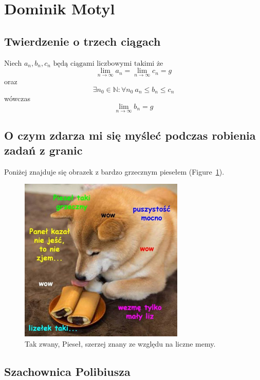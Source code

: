 \section{Dominik Motyl}
\label{sec:Dominik Motyl}

\subsection{Twierdzenie o trzech ciągach}
Niech $ a_n, b_n, c_n \textrm{ będą ciągami liczbowymi takimi że } $
\[ \displaystyle{\lim_{n \to \infty}} a_n = \displaystyle{\lim_{n \to \infty}} c_n = g \] oraz \\
\[ 
\exists n_0 \in \mathbb{N} : \forall n_0 \ a_n \leq b_n \leq c_n 
\] wówczas  
\[ \lim_{n \to \infty} b_n = g \]

\subsection{O czym zdarza mi się myśleć podczas robienia zadań z granic}


Poniżej znajduje się obrazek z bardzo grzecznym piesełem (Figure~\ref{fig:słynny pieseł}).

\begin{figure}[htbp]
    \centering
    \includegraphics[width=0.7\textwidth]{pictures/piesel.jpg}
    \caption{Tak zwany, Pieseł, szerzej znany ze względu na liczne memy.}
    \label{fig:słynny pieseł}
\end{figure}

\subsection{Szachownica Polibiusza}

